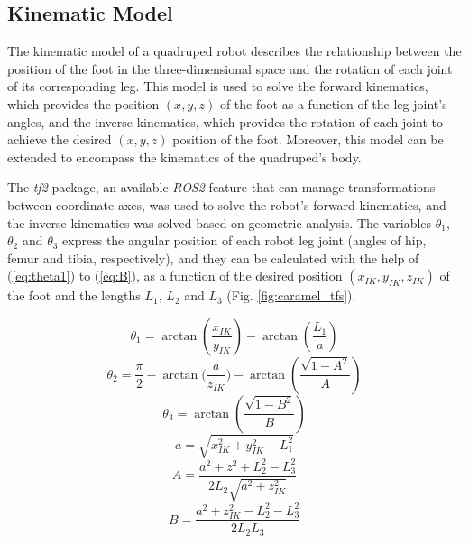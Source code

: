 \documentclass[conference]{IEEEtran}
\begin{document}
\subsection{Kinematic Model}
\label{sec:detail_inv_kinematics}

The kinematic model of a quadruped robot describes the relationship between the position of the foot in the three-dimensional space and the rotation of each joint of its corresponding leg. This model is used to solve the forward kinematics, which provides the position $(x, y, z)$ of the foot as a function of the leg joint's angles, and the inverse kinematics, which provides the rotation of each joint to achieve the desired $(x, y, z)$ position of the foot. Moreover, this model can be extended to encompass the kinematics of the quadruped's body.

The \textit{tf2} package, an available \textit{ROS2} feature that can manage transformations between coordinate axes, was used to solve the robot's forward kinematics, and the inverse kinematics was solved based on geometric analysis. The variables $\theta_1$, $\theta_2$ and $\theta_3$ express the angular position of each robot leg joint (angles of hip, femur and tibia, respectively), and they can be calculated with the help of (\ref{eq:theta1}) to (\ref{eq:B}), as a function of the desired position $(x_{IK}, y_{IK}, z_{IK})$ of the foot and the lengths $L_1$, $L_2$ and $L_3$ (Fig. \ref{fig:caramel_tfs}).

\begin{equation}
  \label{eq:theta1}
  \theta_1 = \arctan{(\frac{x_{IK}}{y_{IK}})} - \arctan{(\frac{L_1}{a})}
\end{equation}
\begin{equation}
  \label{eq:theta2}
  \theta_2 = \frac{\pi}{2} - \arctan{(\frac{a}{z_{IK}}}) - \arctan{(\frac{\sqrt{1-A^2}}{A})}
\end{equation}
\begin{equation}
  \label{eq:theta3}
  \theta_3 = \arctan(\frac{\sqrt{1-B^2}}{B})
\end{equation}
\begin{equation}
  \label{eq:a}
  a = \sqrt{x_{IK}^2+y_{IK}^2-L_1^2}
\end{equation}
\begin{equation}
  \label{eq:A}
  A =\frac{a^2+z^2+L_2^2-L_3^2}{2L_2\sqrt{a^2+z_{IK}^2}}
\end{equation}
\begin{equation}
  \label{eq:B}
  B = \frac{a^2+z_{IK}^2-L_2^2-L_3^2}{2L_2L_3}
\end{equation}
\end{document}
